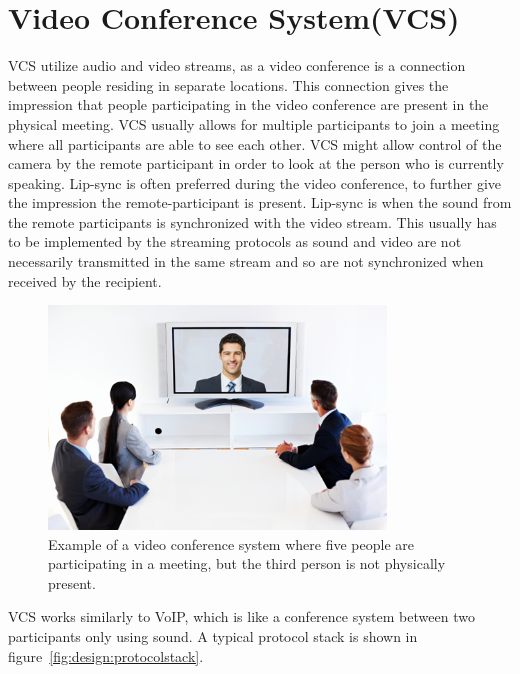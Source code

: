 




\section{Video Conference System(VCS)} \label{sec:design:vcs}
\ac{VCS} utilize audio and video streams, as a video conference is a connection between people residing in separate locations. This connection gives the impression that people participating in the video conference are present in the physical meeting. VCS usually allows for multiple participants to join a meeting where all participants are able to see each other. VCS might allow control of the camera by the remote participant in order to look at the person who is currently speaking. 
Lip-sync is often preferred during the video conference, to further give the impression the remote-participant is present. Lip-sync is when the sound from the remote participants is synchronized with the video stream. This usually has to be implemented by the streaming protocols as sound and video are not necessarily transmitted in the same stream and so are not synchronized when received by the recipient.

\begin{figure}[H]
	\centering
	\includegraphics[width=0.8\textwidth]{figures/vcs_overview.png}
	\caption{Example of a video conference system where five people are participating in a meeting, but the third person is not physically present.} \label{fig:design:vcs}
\end{figure}

\ac{VCS} works similarly to \ac{VoIP}, which is like a conference system between two participants only using sound. A typical protocol stack is shown in figure~\ref{fig:design:protocolstack}. 

